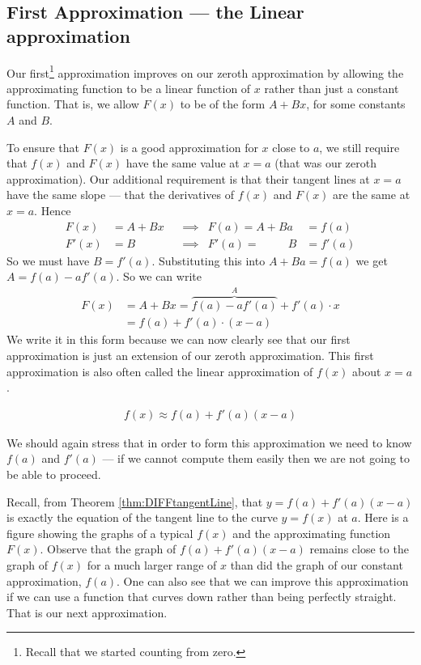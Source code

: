 \subsection{First Approximation --- the Linear approximation}
\label{ssec_first_approx}
Our first\footnote{Recall that we started counting from
zero.} approximation improves on our zeroth approximation by allowing the approximating
function to be a linear function of $x$ rather than just a constant function. That is, we
allow $F(x)$ to be of the form $A+Bx$, for some constants $A$ and $B$.


To ensure that $F(x)$ is a good approximation for $x$ close to $a$, we still require that
$f(x)$ and $F(x)$ have the same value at $x=a$ (that was our zeroth approximation). Our
additional requirement is that their tangent lines at $x=a$ have the same slope --- that
the derivatives of $f(x)$ and $F(x)$ are the same at $x=a$. Hence
\begin{align*}
F(x)&=A+Bx  & &\implies & F(a)=A+Ba&=f(a)\\
F'(x)&=B    & &\implies & F'(a)=\phantom{A+a}B&=f'(a)
\end{align*}
So we must have $B=f'(a)$. Substituting this into $A+Ba=f(a)$ we get
$A=f(a)-af'(a)$. So
we can write
\begin{align*}
  F(x) &= A+Bx = \overbrace{f(a)- af'(a)}^A+ f'(a) \cdot x \\
  &= f(a) + f'(a) \cdot(x-a)
\end{align*}
We write it in this form because we can now clearly see that our first approximation is
just an extension of our zeroth approximation. This first approximation is also often
called the linear approximation of $f(x)$ about $x=a$.
\begin{impeqn}\label{eq:linApprox}
\begin{align*}
  f(x) \approx f(a)+f'(a)(x-a)
\end{align*}
\end{impeqn}
\noindent We should again stress that in order to form this approximation we need to know
$f(a)$ and $f'(a)$ --- if we cannot compute them easily then we are not going to be able
to proceed.



Recall, from Theorem \ref{thm:DIFFtangentLine}, that $y=f(a)+f'(a)(x-a)$
is exactly the equation of the tangent line to the curve $y=f(x)$ at $a$.
Here is a figure showing the graphs of a typical $f(x)$ and the approximating
function $F(x)$.
Observe that the graph of $f(a)+f'(a)(x-a)$ remains close to the
graph of $f(x)$ for a much larger range of $x$ than did the graph of our constant
approximation, $f(a)$. One can also see that we can improve this approximation if we can
use a function that curves down rather than being perfectly straight. That is our next
approximation.

